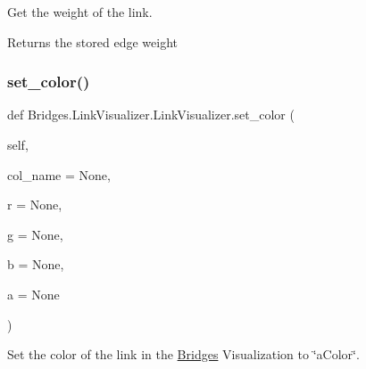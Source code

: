Get the weight of the link. 

\begin{DoxyReturn}{Returns}
the stored edge weight 
\end{DoxyReturn}
\mbox{\label{class_bridges_1_1_link_visualizer_1_1_link_visualizer_aeafa2ddabd4c033a382317e0a01d1f85}} 
\subsubsection{\texorpdfstring{set\+\_\+color()}{set\_color()}}
{\footnotesize\ttfamily def Bridges.\+Link\+Visualizer.\+Link\+Visualizer.\+set\+\_\+color (\begin{DoxyParamCaption}\item[{}]{self,  }\item[{}]{col\+\_\+name = {\ttfamily None},  }\item[{}]{r = {\ttfamily None},  }\item[{}]{g = {\ttfamily None},  }\item[{}]{b = {\ttfamily None},  }\item[{}]{a = {\ttfamily None} }\end{DoxyParamCaption})}



Set the color of the link in the \mbox{\hyperlink{namespace_bridges_1_1_bridges}{Bridges}} Visualization to \char`\"{}a\+Color\char`\"{}. 


